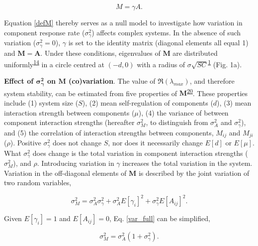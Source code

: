 \documentclass[]{article}
\begin{document}
\begin{equation} \label{defM}
M = \gamma A.
\end{equation}

Equation \ref{defM} thereby serves as a null model to investigate how
variation in component response rate (\(\sigma^{2}_{\gamma}\)) affects
complex systems. In the absence of such variation
(\(\sigma^{2}_{\gamma} = 0\)), \(\gamma\) is set to the identity matrix
(diagonal elements all equal 1) and \(\mathbf{M} = \mathbf{A}\). Under
these conditions, eigenvalues of \(\mathbf{M}\) are distributed
uniformly\textsuperscript{\protect\hyperlink{ref-Tao2010}{14}} in a
circle centred at \((-d, 0)\) with a radius of
\(\sigma \sqrt{SC}\)\textsuperscript{\protect\hyperlink{ref-May1972}{1}}
(Fig. 1a).

\textbf{Effect of \(\mathbf{\sigma^{2}_{\gamma}}\) on \(\mathbf{M}\)
(co)variation}. The value of \(\Re(\lambda_{max})\), and therefore
system stability, can be estimated from five properties of
\(\mathbf{M}\)\textsuperscript{\protect\hyperlink{ref-Tang2014b}{20}}.
These properties include (1) system size (\(S\)), (2) mean
self-regulation of components (\(d\)), (3) mean interaction strength
between components (\(\mu\)), (4) the variance of between component
interaction strengths (hereafter \(\sigma^{2}_{M}\), to distinguish from
\(\sigma^{2}_{A}\) and \(\sigma^{2}_{\gamma}\)), and (5) the correlation
of interaction strengths between components, \(M_{ij}\) and \(M_{ji}\)
(\(\rho\)). Positive \(\sigma^{2}_{\gamma}\) does not change \(S\), nor
does it necessarily change \(E[d]\) or \(E[\mu]\). What
\(\sigma^{2}_{\gamma}\) does change is the total variation in component
interaction strengths (\(\sigma^{2}_{M}\)), and \(\rho\). Introducing
variation in \(\gamma\) increases the total variation in the system.
Variation in the off-diagonal elements of \(\mathbf{M}\) is described by
the joint variation of two random variables,

\begin{equation} \label{var_full}
\sigma^{2}_{M} = \sigma^{2}_{A}\sigma^{2}_{\gamma} + \sigma^{2}_{A}E[\gamma_{i}]^{2}+\sigma^{2}_{\gamma}E[A_{ij}]^{2}.
\end{equation}

Given \(E[\gamma_{i}] = 1\) and \(E[A_{ij}] = 0\), Eq. \ref{var_full}
can be simplified,

\begin{equation} \label{var_reduced}
\sigma^{2}_{M} = \sigma^{2}_{A}(1 + \sigma^{2}_{\gamma}).
\end{equation}
\end{document}
